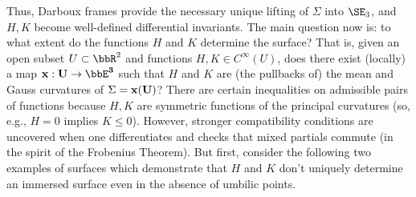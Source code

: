 Thus, Darboux frames provide the necessary unique lifting of $\Sigma$ into $\SE_3$, and $H,K$ become well-defined differential invariants. The main question now is: to what extent do the functions $H$ and $K$ determine the surface? That is, given an open subset $U\subset\bbR^2$ and functions $H,K\in C^\infty(U)$, does there exist (locally) a map $\bf{x}:U\to \bbE^3$ such that $H$ and $K$ are (the pullbacks of) the mean and Gauss curvatures of $\Sigma=\bf{x}(U)$? There are certain inequalities on admissible pairs of functions because $H,K$ are symmetric functions of the principal curvatures (so, e.g., $H=0$ implies $K\leq 0$). However, stronger compatibility conditions are uncovered when one differentiates and checks that mixed partials commute (in the spirit of the Frobenius Theorem). But first, consider the following two examples of surfaces which demonstrate that $H$ and $K$ don't uniquely determine an immersed surface even in the absence of umbilic points.

